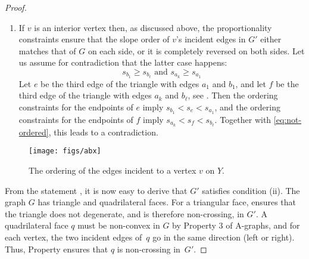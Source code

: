 \begin{proof}
\begin{enumerate}
\begin{enumerate}
\item If $v$ is an interior vertex then,
  as discussed above, the proportionality constraints ensure that the
  slope order of $v$'s incident edges in $G'$ either matches that of
  $G$ on each side, or it is completely reversed on both sides.
  Let us assume for contradiction that the latter case happens:
  \begin{equation}
    \label{eq:not-ordered}
    s_{b_1}\ge s_{b_\ell}
    \text{ and }
    s_{a_k}\ge s_{a_1}
  \end{equation}
  Let $e$ be the third edge of the triangle with edges $a_1$ and
  $b_1$, and let $f$ be the third edge of the triangle with edges
  $a_k$ and $b_\ell$, see .
			Then the ordering constraints for the endpoints of $e$ imply
			\begin{math}
			s_{b_1}<s_e<s_{a_1}
			\end{math},
			and the ordering constraints for the endpoints of $f$ imply
			\begin{math}
			s_{a_k}<s_f<s_{b_\ell}
			\end{math}.
			Together with \eqref{eq:not-ordered}, this leads to a contradiction.
		\end{enumerate}
\end{enumerate}

\begin{figure}
  \centering
  {\texttt{[image: figs/abx]}}
  \caption{The ordering of the edges incident to a vertex $v$ on $Y$.}
\end{figure}


From the statement \thetag{$*$}, it is now easy to derive that
$G'$ satisfies condition (ii).
The graph $G$ has triangle and quadrilateral faces.
%
For a triangular face, \thetag{$*$} ensures that the triangle does not
degenerate, and is therefore non-crossing, in $G'$.
A quadrilateral face $q$ must be non-convex in $G$ by Property 3 of
A-graphs, and for each vertex, the two incident edges of~$q$ go in
the same direction (left or right).
Thus, Property \thetag{$*$} ensures that $q$ is non-crossing in~$G'$.





\end{proof}
